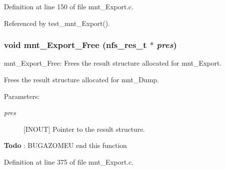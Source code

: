 Definition at line 150 of file mnt\_\-Export.c.

Referenced by test\_\-mnt\_\-Export().
\subsubsection{\setlength{\rightskip}{0pt plus 5cm}void mnt\_\-Export\_\-Free (nfs\_\-res\_\-t $\ast$ {\em pres})}\label{mnt__Export_8c_a2}


mnt\_\-Export\_\-Free: Frees the result structure allocated for mnt\_\-Export.

Frees the result structure allocated for mnt\_\-Dump.

\begin{Desc}
\item[Parameters:]
\begin{description}
\item[{\em pres}][INOUT] Pointer to the result structure.\end{description}
\end{Desc}


\begin{Desc}
\item[{\bf Todo}]: BUGAZOMEU end this function\end{Desc}


Definition at line 375 of file mnt\_\-Export.c.